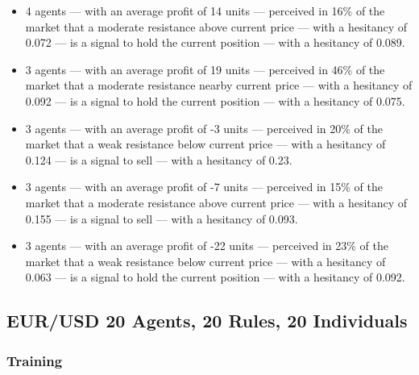 {\scriptsize
  \begin{itemize}
    \item 4 agents — with an average profit of 14 units — perceived in 16\% of
      the market that a moderate resistance above current price — with a
      hesitancy of 0.072 — is a signal to hold the current position — with a
      hesitancy of 0.089.
\item 3 agents — with an average profit of 19 units — perceived in 46\% of the
  market that a moderate resistance nearby current price — with a hesitancy of
  0.092 — is a signal to hold the current position — with a hesitancy of 0.075.
\item 3 agents — with an average profit of -3 units — perceived in 20\% of the
  market that a weak resistance below current price — with a hesitancy of 0.124
  — is a signal to sell — with a hesitancy of 0.23.
\item 3 agents — with an average profit of -7 units — perceived in 15\% of the
  market that a moderate resistance above current price — with a hesitancy of
  0.155 — is a signal to sell — with a hesitancy of 0.093.
\item 3 agents — with an average profit of -22 units — perceived in 23\% of the
  market that a weak resistance below current price — with a hesitancy of 0.063
  — is a signal to hold the current position — with a hesitancy of 0.092.
  \end{itemize}
}

\subsection{EUR/USD 20 Agents, 20 Rules, 20 Individuals}
\label{}

\subsubsection{Training}
\label{}

